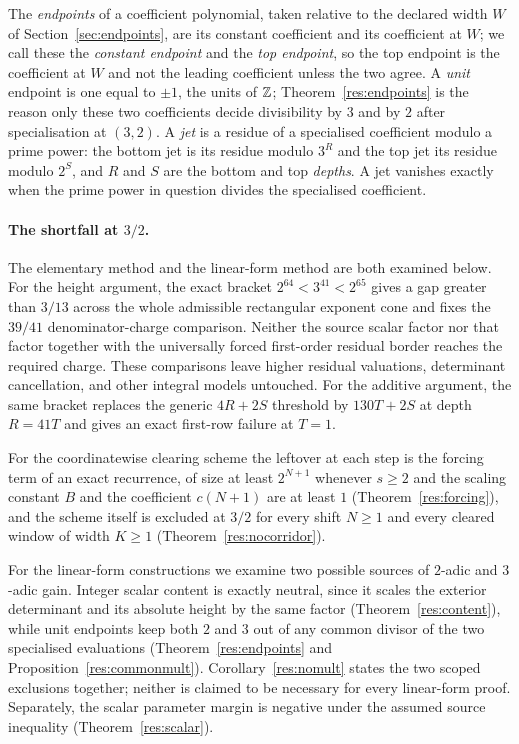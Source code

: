 \documentclass[11pt]{article}
\begin{document}
The \emph{endpoints} of a coefficient polynomial, taken relative to
the declared width $W$ of Section~\ref{sec:endpoints}, are its constant
coefficient and its coefficient at $W$; we call these the \emph{constant
endpoint} and the \emph{top endpoint}, so the top endpoint is the coefficient
at $W$ and not the leading coefficient unless the two agree.  A \emph{unit}
endpoint is one equal
to $\pm1$, the units of $\mathbb{Z}$; Theorem~\ref{res:endpoints} is the reason only these
two coefficients decide divisibility by $3$ and by $2$ after specialisation at
$(3,2)$.  A \emph{jet} is a
residue of a specialised coefficient modulo a prime power: the bottom jet is
its residue modulo $3^{R}$ and the top jet its residue modulo $2^{S}$, and $R$
and $S$ are the bottom and top \emph{depths}.  A jet vanishes exactly when the
prime power in question divides the specialised coefficient.

\paragraph{The shortfall at $3/2$.}
The elementary method and the linear-form method are both examined below.  For
the height argument, the exact bracket $2^{64}<3^{41}<2^{65}$ gives a gap greater
than $3/13$ across the whole admissible rectangular exponent cone and fixes the
$39/41$ denominator-charge comparison.  Neither the source scalar factor nor
that factor together with the universally forced first-order residual border
reaches the required charge.  These comparisons leave higher residual
valuations, determinant cancellation, and other integral models untouched.
For the additive argument, the same bracket replaces the generic
$4R+2S$ threshold by $130T+2S$ at depth $R=41T$ and gives an exact first-row
failure at $T=1$.

For
the coordinatewise clearing scheme the leftover at each step is the forcing
term of an exact recurrence, of size at least
$2^{N+1}$ whenever $s\ge2$ and the scaling constant $B$ and the coefficient
$c(N+1)$ are at least $1$
(Theorem~\ref{res:forcing}), and the
scheme itself is excluded at $3/2$ for every shift $N\ge1$ and every cleared
window of width $K\ge1$ (Theorem~\ref{res:nocorridor}).

For the linear-form
constructions we examine two possible sources of $2$-adic and $3$-adic gain.
Integer scalar content is exactly neutral, since it scales the exterior
determinant and its absolute height by the same factor
(Theorem~\ref{res:content}), while unit endpoints keep both $2$ and $3$ out of
any common divisor of the two specialised evaluations
(Theorem~\ref{res:endpoints} and Proposition~\ref{res:commonmult}).
Corollary~\ref{res:nomult} states the two scoped exclusions together; neither
is claimed to be necessary for every linear-form proof.  Separately, the scalar
parameter margin is negative under the assumed source inequality
(Theorem~\ref{res:scalar}).
\end{document}
